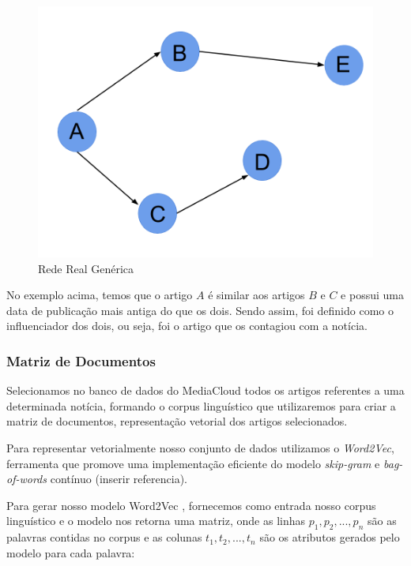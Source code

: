 \documentclass[a4paper,12pt]{article}
\begin{document}
\begin{figure}[h]
 \centering
 \includegraphics[scale=0.2]{./rede1.png}
 \caption{Rede Real Genérica}
\end{figure}

No exemplo acima, temos que o artigo $A$ é similar aos artigos $B$ e $C$ e possui uma data de publicação mais antiga do que os dois. 
Sendo assim, foi definido como o influenciador dos dois, ou seja, foi o artigo que os contagiou com a notícia.

\pagebreak
\subsubsection{Matriz de Documentos}

Selecionamos no banco de dados do MediaCloud todos os artigos referentes a uma determinada notícia, formando o corpus linguístico que 
utilizaremos para criar a matriz de documentos, representação vetorial dos artigos selecionados.

Para representar vetorialmente nosso conjunto de dados utilizamos o \textit{Word2Vec}, ferramenta que promove uma implementação 
eficiente do modelo \textit{skip-gram} e \textit{bag-of-words} contínuo (inserir referencia).

Para gerar nosso modelo Word2Vec , fornecemos como entrada nosso corpus linguístico
e o modelo nos retorna uma matriz, onde as linhas $p_{1},p_{2},...,p_{n}$ são as palavras contidas no corpus e as colunas $t_{1},t_{2},...,t_{n}$
são os atributos gerados pelo modelo para cada palavra:
 
\end{document}
